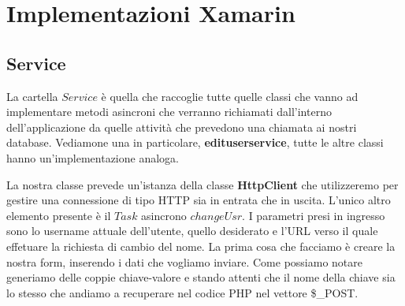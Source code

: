 \documentclass[a4paper, 50pt, twoside]{article}
\begin{document}
\section{Implementazioni Xamarin}
\subsection{Service}
La cartella $Service$ è quella che raccoglie tutte quelle classi che vanno ad implementare metodi asincroni che verranno richiamati dall'interno dell'applicazione da quelle attività che prevedono una chiamata ai nostri database. Vediamone una in particolare, \textbf{edituserservice}, tutte le altre classi hanno un'implementazione analoga.

La nostra classe prevede un'istanza della classe \textbf{HttpClient} che utilizzeremo per gestire una connessione di tipo HTTP sia in entrata che in uscita. L'unico altro elemento presente è il $Task$ asincrono $changeUsr$. I parametri presi in ingresso sono lo username attuale dell'utente, quello desiderato e l'URL verso il quale effetuare la richiesta di cambio del nome. La prima cosa che facciamo è creare la nostra form, inserendo i dati che vogliamo inviare. Come possiamo notare generiamo delle coppie chiave-valore e stando attenti che il nome della chiave sia lo stesso che andiamo a recuperare nel codice PHP nel vettore \$\_POST.
\end{document}
